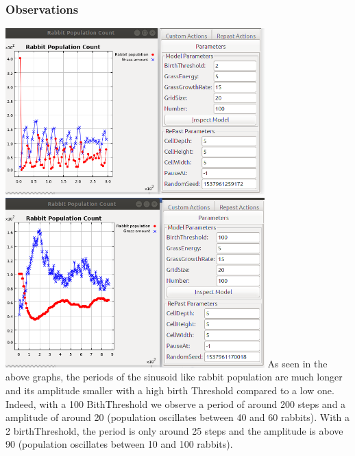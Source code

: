 \documentclass[11pt]{article}
\begin{document}
 \subsubsection{Observations}

 \includegraphics[width=10cm]{fast_sinusoid.png}
 \includegraphics[width=10cm]{slow_sinusoid.png}
 As seen in the above graphs, the periods of the sinusoid like rabbit population are much longer and its amplitude smaller with a high birth Threshold compared to a low one. Indeed, with a 100 BithThreshold we observe a period of around 200 steps and a amplitude of around 20 (population oscillates between 40 and 60 rabbits). With a 2 birthThreshold, the period is only  around 25 steps and the amplitude is above 90 (population oscillates between 10 and 100 rabbits).
\end{document}
